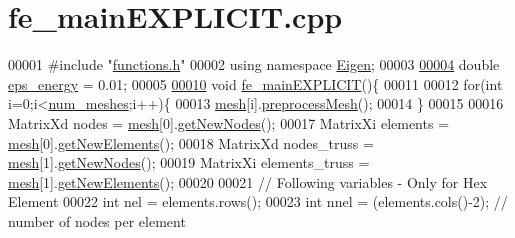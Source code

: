 \hypertarget{fe__main_e_x_p_l_i_c_i_t_8cpp_source}{}\section{fe\+\_\+main\+E\+X\+P\+L\+I\+C\+I\+T.\+cpp}
\label{fe__main_e_x_p_l_i_c_i_t_8cpp_source}

\begin{DoxyCode}
00001 \textcolor{preprocessor}{#include "\hyperlink{functions_8h}{functions.h}"}
00002 \textcolor{keyword}{using namespace }\hyperlink{namespace_eigen}{Eigen};
00003 
\hyperlink{fe__main_e_x_p_l_i_c_i_t_8cpp_a33157279f223d2f4775b0d78b73bc08f}{00004} \textcolor{keywordtype}{double} \hyperlink{fe__main_e_x_p_l_i_c_i_t_8cpp_a33157279f223d2f4775b0d78b73bc08f}{eps\_energy} = 0.01;
00005 
\hyperlink{fe__main_e_x_p_l_i_c_i_t_8cpp_ab2f8704631ca6c23a453d1905efbb162}{00010} \textcolor{keywordtype}{void} \hyperlink{fe__main_e_x_p_l_i_c_i_t_8cpp_ab2f8704631ca6c23a453d1905efbb162}{fe\_mainEXPLICIT}()\{
00011 
00012     \textcolor{keywordflow}{for}(\textcolor{keywordtype}{int} i=0;i<\hyperlink{_global_variables_8h_a509bc84434af1eff0173e4a71bd758ac}{num\_meshes};i++)\{
00013         \hyperlink{_global_variables_8h_a6e08f89b32254fb4b129720418e7c6ea}{mesh}[i].\hyperlink{class_mesh_aa8a6f260e9589be4c0a2fcc146e696d5}{preprocessMesh}();
00014     \}
00015 
00016     MatrixXd nodes = \hyperlink{_global_variables_8h_a6e08f89b32254fb4b129720418e7c6ea}{mesh}[0].\hyperlink{class_mesh_a52ecce406bbef80cbf3610db3ea5ea40}{getNewNodes}();
00017     MatrixXi elements = \hyperlink{_global_variables_8h_a6e08f89b32254fb4b129720418e7c6ea}{mesh}[0].\hyperlink{class_mesh_a6e425e9499e64ab52c4555aa3763651d}{getNewElements}();
00018     MatrixXd nodes\_truss = \hyperlink{_global_variables_8h_a6e08f89b32254fb4b129720418e7c6ea}{mesh}[1].\hyperlink{class_mesh_a52ecce406bbef80cbf3610db3ea5ea40}{getNewNodes}();
00019     MatrixXi elements\_truss = \hyperlink{_global_variables_8h_a6e08f89b32254fb4b129720418e7c6ea}{mesh}[1].\hyperlink{class_mesh_a6e425e9499e64ab52c4555aa3763651d}{getNewElements}();
00020 
00021     \textcolor{comment}{// Following variables - Only for Hex Element}
00022     \textcolor{keywordtype}{int} nel = elements.rows(); 
00023     \textcolor{keywordtype}{int} nnel = (elements.cols()-2); \textcolor{comment}{// number of nodes per element}

\end{DoxyCode}
